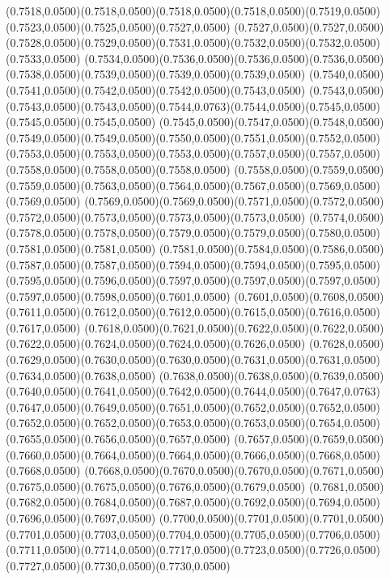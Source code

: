 (0.7518,0.0500)(0.7518,0.0500)(0.7518,0.0500)(0.7518,0.0500)(0.7519,0.0500)(0.7523,0.0500)(0.7525,0.0500)(0.7527,0.0500)
(0.7527,0.0500)(0.7527,0.0500)(0.7528,0.0500)(0.7529,0.0500)(0.7531,0.0500)(0.7532,0.0500)(0.7532,0.0500)(0.7533,0.0500)
(0.7534,0.0500)(0.7536,0.0500)(0.7536,0.0500)(0.7536,0.0500)(0.7538,0.0500)(0.7539,0.0500)(0.7539,0.0500)(0.7539,0.0500)
(0.7540,0.0500)(0.7541,0.0500)(0.7542,0.0500)(0.7542,0.0500)(0.7543,0.0500)
\PST@Solid(0.7543,0.0500)(0.7543,0.0500)(0.7543,0.0500)(0.7544,0.0763)(0.7544,0.0500)(0.7545,0.0500)(0.7545,0.0500)(0.7545,0.0500)
(0.7545,0.0500)(0.7547,0.0500)(0.7548,0.0500)(0.7549,0.0500)(0.7549,0.0500)(0.7550,0.0500)(0.7551,0.0500)(0.7552,0.0500)
(0.7553,0.0500)(0.7553,0.0500)(0.7553,0.0500)(0.7557,0.0500)(0.7557,0.0500)(0.7558,0.0500)(0.7558,0.0500)(0.7558,0.0500)
(0.7558,0.0500)(0.7559,0.0500)(0.7559,0.0500)(0.7563,0.0500)(0.7564,0.0500)(0.7567,0.0500)(0.7569,0.0500)(0.7569,0.0500)
(0.7569,0.0500)(0.7569,0.0500)(0.7571,0.0500)(0.7572,0.0500)(0.7572,0.0500)(0.7573,0.0500)(0.7573,0.0500)(0.7573,0.0500)
(0.7574,0.0500)(0.7578,0.0500)(0.7578,0.0500)(0.7579,0.0500)(0.7579,0.0500)(0.7580,0.0500)(0.7581,0.0500)(0.7581,0.0500)
(0.7581,0.0500)(0.7584,0.0500)(0.7586,0.0500)(0.7587,0.0500)(0.7587,0.0500)(0.7594,0.0500)(0.7594,0.0500)(0.7595,0.0500)
(0.7595,0.0500)(0.7596,0.0500)(0.7597,0.0500)(0.7597,0.0500)(0.7597,0.0500)(0.7597,0.0500)(0.7598,0.0500)(0.7601,0.0500)
(0.7601,0.0500)(0.7608,0.0500)(0.7611,0.0500)(0.7612,0.0500)(0.7612,0.0500)(0.7615,0.0500)(0.7616,0.0500)(0.7617,0.0500)
(0.7618,0.0500)(0.7621,0.0500)(0.7622,0.0500)(0.7622,0.0500)(0.7622,0.0500)(0.7624,0.0500)(0.7624,0.0500)(0.7626,0.0500)
(0.7628,0.0500)(0.7629,0.0500)(0.7630,0.0500)(0.7630,0.0500)(0.7631,0.0500)(0.7631,0.0500)(0.7634,0.0500)(0.7638,0.0500)
(0.7638,0.0500)(0.7638,0.0500)(0.7639,0.0500)(0.7640,0.0500)(0.7641,0.0500)(0.7642,0.0500)(0.7644,0.0500)(0.7647,0.0763)
(0.7647,0.0500)(0.7649,0.0500)(0.7651,0.0500)(0.7652,0.0500)(0.7652,0.0500)
\PST@Solid(0.7652,0.0500)(0.7652,0.0500)(0.7653,0.0500)(0.7653,0.0500)(0.7654,0.0500)(0.7655,0.0500)(0.7656,0.0500)(0.7657,0.0500)
(0.7657,0.0500)(0.7659,0.0500)(0.7660,0.0500)(0.7664,0.0500)(0.7664,0.0500)(0.7666,0.0500)(0.7668,0.0500)(0.7668,0.0500)
(0.7668,0.0500)(0.7670,0.0500)(0.7670,0.0500)(0.7671,0.0500)(0.7675,0.0500)(0.7675,0.0500)(0.7676,0.0500)(0.7679,0.0500)
(0.7681,0.0500)(0.7682,0.0500)(0.7684,0.0500)(0.7687,0.0500)(0.7692,0.0500)(0.7694,0.0500)(0.7696,0.0500)(0.7697,0.0500)
(0.7700,0.0500)(0.7701,0.0500)(0.7701,0.0500)(0.7701,0.0500)(0.7703,0.0500)(0.7704,0.0500)(0.7705,0.0500)(0.7706,0.0500)
(0.7711,0.0500)(0.7714,0.0500)(0.7717,0.0500)(0.7723,0.0500)(0.7726,0.0500)(0.7727,0.0500)(0.7730,0.0500)(0.7730,0.0500)
